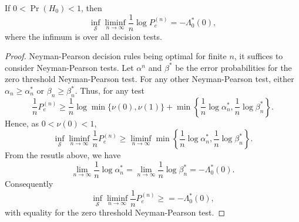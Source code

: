 \begin{theorem}[Chernoff]
If $0 < \Pr (H_0) < 1$, then
\begin{equation*}
\inf_{\mathcal{S}} \liminf_{n \rightarrow \infty} \frac{1}{n} \log P_e^{(n)}
= - \Lambda_0^* (0) ,
\end{equation*}
where the infimum is over all decision tests.
\end{theorem}
\begin{proof}
Neyman-Pearson decision rules being optimal for finite $n$, it suffices to consider Neyman-Pearson tests.
Let $\alpha^n$ and $\beta^*$ be the error probabilities for the zero threshold Neyman-Pearson test.
For any other Neyman-Pearson test, either $\alpha_n \geq \alpha_n^*$ or $\beta_n \geq \beta_n^*$.
Thus, for any test
\begin{equation*}
\frac{1}{n} P_e^{(n)} \geq \frac{1}{n} \log \min \{ \nu (0), \nu(1) \}
+ \min \left\{ \frac{1}{n} \log \alpha_n^*, \frac{1}{n} \log \beta_n^* \right\} .
\end{equation*}
Hence, as $0 < \nu(0) < 1$,
\begin{equation*}
\inf_{\mathcal{S}} \liminf_{n \rightarrow \infty}
\frac{1}{n} P_e^{(n)} \geq \liminf_{n \rightarrow \infty}
\min \left\{ \frac{1}{n} \log \alpha_n^*, \frac{1}{n} \log \beta_n^* \right\} .
\end{equation*}
From the resutls above, we have
\begin{equation*}
\lim_{n \rightarrow \infty} \frac{1}{n} \log \alpha_n^*
= \lim_{n \rightarrow \infty} \frac{1}{n} \log \beta_n^*
= - \Lambda_0^* (0) .
\end{equation*}
Consequently
\begin{equation*}
\inf_{\mathcal{S}} \liminf_{n \rightarrow \infty}
\frac{1}{n} P_e^{(n)} \geq = - \Lambda_0^* (0) ,
\end{equation*}
with equality for the zero threshold Neyman-Pearson test.
\end{proof}

